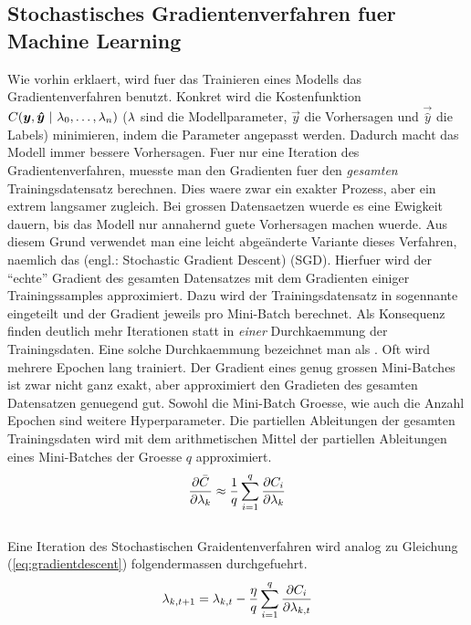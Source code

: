 \subsection{Stochastisches Gradientenverfahren fuer Machine Learning}
Wie vorhin erklaert, wird fuer das Trainieren eines Modells das Gradientenverfahren benutzt.
Konkret wird die Kostenfunktion $C(\vec{y},\vec{\hat{y}}\ |\ \param_0,\ldots,\param_n)$
($\lambda$ sind die Modellparameter, $\vec{y}$ die Vorhersagen und $\vec{\hat{y}}$
die Labels) minimieren, indem die Parameter angepasst werden. Dadurch macht das Modell immer bessere Vorhersagen.
Fuer nur eine Iteration des Gradientenverfahren, muesste man den Gradienten fuer den
\textit{gesamten} Trainingsdatensatz berechnen.
Dies waere zwar ein exakter Prozess, aber ein extrem langsamer zugleich.
Bei grossen Datensaetzen wuerde es eine Ewigkeit dauern, bis das Modell nur annahernd guete Vorhersagen machen wuerde.
\para{}
Aus diesem Grund verwendet man eine leicht abgeänderte Variante dieses
Verfahren, naemlich das  (engl.:
Stochastic Gradient Descent) (SGD).
Hierfuer wird der ``echte'' Gradient des gesamten Datensatzes mit dem Gradienten einiger Trainingssamples approximiert.
Dazu wird der Trainingsdatensatz in sogennante  eingeteilt und der Gradient jeweils pro Mini-Batch berechnet.
Als Konsequenz finden deutlich mehr Iterationen statt in \textit{einer}
Durchkaemmung der Trainingsdaten. Eine solche Durchkaemmung bezeichnet man als
. Oft wird mehrere Epochen lang trainiert.
Der Gradient eines genug grossen Mini-Batches ist zwar nicht ganz exakt, aber approximiert den Gradieten des gesamten Datensatzen genuegend gut.
Sowohl die Mini-Batch Groesse, wie auch die Anzahl Epochen sind weitere Hyperparameter.
\para{}
Die partiellen Ableitungen der gesamten Trainingsdaten wird mit dem
arithmetischen Mittel der partiellen Ableitungen eines Mini-Batches der Groesse $q$ approximiert.
\\
\begin{equation}\label{eq:minibatch_deriv}
  \frac{\partial \bar{C}}{\partial \lambda_k} \approx \frac{1}{q}\sum_{i=1}^{q} \frac{\partial C_i}{\partial \lambda_k}
\end{equation}
\\
Eine Iteration des Stochastischen Graidentenverfahren wird analog zu Gleichung (\ref{eq:gradientdescent}) folgendermassen durchgefuehrt.
\\
\begin{equation}\label{eq:sgd}
  \lambda_{k,t+1} = \lambda_{k,t} - \frac{\eta}{q} \sum_{i=1}^{q} \frac{\partial C_i}{\partial \lambda_{k,t}}
\end{equation}


